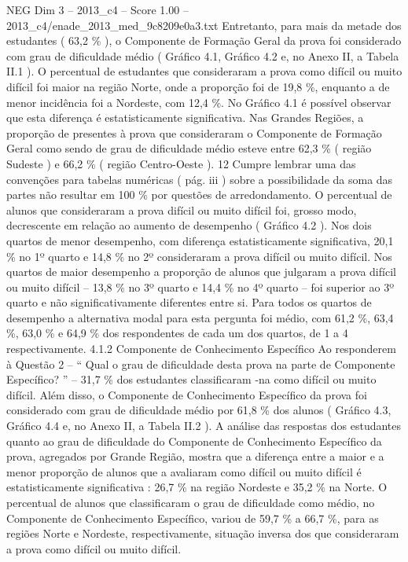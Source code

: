 \begin{textsample}{NEG Dim 3 – 2013\_c4 – Score 1.00 – 2013\_c4/enade\_2013\_med\_9c8209e0a3.txt}
Entretanto, para mais da metade dos estudantes ( 63,2 \% ), o Componente de Formação Geral da prova foi considerado com grau de dificuldade médio ( Gráfico 4.1, Gráfico 4.2 e, no Anexo II, a Tabela II.1 ).
O percentual de estudantes que consideraram a prova como difícil ou muito difícil foi maior na região Norte, onde a proporção foi de 19,8 \%, enquanto a de menor incidência foi a Nordeste, com 12,4 \%.
No Gráfico 4.1 é possível observar que esta diferença é estatisticamente significativa.
Nas Grandes Regiões, a proporção de presentes à prova que consideraram o Componente de Formação Geral como sendo de grau de dificuldade médio esteve entre 62,3 \% ( região Sudeste ) e 66,2 \% ( região Centro-Oeste ). 12 Cumpre lembrar uma das convenções para tabelas numéricas ( pág. iii ) sobre a possibilidade da soma das partes não resultar em 100 \% por questões de arredondamento.
O percentual de alunos que consideraram a prova difícil ou muito difícil foi, grosso modo, decrescente em relação ao aumento de desempenho ( Gráfico 4.2 ).
Nos dois quartos de menor desempenho, com diferença estatisticamente significativa, 20,1 \% no 1º quarto e 14,8 \% no 2º consideraram a prova difícil ou muito difícil.
Nos quartos de maior desempenho a proporção de alunos que julgaram a prova difícil ou muito difícil – 13,8 \% no 3º quarto e 14,4 \% no 4º quarto – foi superior ao 3º quarto e não significativamente diferentes entre si.
Para todos os quartos de desempenho a alternativa modal para esta pergunta foi médio, com 61,2 \%, 63,4 \%, 63,0 \% e 64,9 \% dos respondentes de cada um dos quartos, de 1 a 4 respectivamente. 4.1.2 Componente de Conhecimento Específico Ao responderem à Questão 2 – “ Qual o grau de dificuldade desta prova na parte de Componente Específico? ” – 31,7 \% dos estudantes classificaram -na como difícil ou muito difícil.
Além disso, o Componente de Conhecimento Específico da prova foi considerado com grau de dificuldade médio por 61,8 \% dos alunos ( Gráfico 4.3, Gráfico 4.4 e, no Anexo II, a Tabela II.2 ).
A análise das respostas dos estudantes quanto ao grau de dificuldade do Componente de Conhecimento Específico da prova, agregados por Grande Região, mostra que a diferença entre a maior e a menor proporção de alunos que a avaliaram como difícil ou muito difícil é estatisticamente significativa : 26,7 \% na região Nordeste e 35,2 \% na Norte.
O percentual de alunos que classificaram o grau de dificuldade como médio, no Componente de Conhecimento Específico, variou de 59,7 \% a 66,7 \%, para as regiões Norte e Nordeste, respectivamente, situação inversa dos que consideraram a prova como difícil ou muito difícil.

\end{textsample}
